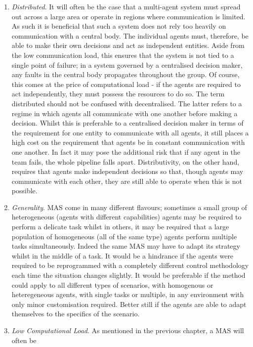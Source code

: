 \documentclass[.../main.tex]{subfiles}
\begin{document}
\begin{enumerate}
    \item {\em Distributed}. It will often be the case that a multi-agent system must spread out
across a large area or operate in regions where communication is limited. As such it is beneficial
that such a system does not rely too heavily on communication with a central body. The individual
agents must, therefore, be able to make their own decisions and act as independent entities. Aside
from the low communication load, this ensures that the system is not tied to a single point of
failure; in a system governed by a centralised decision maker, any faults in the central body
propagates throughout the group. Of course, this comes at the price of computational load - if the
agents are required to act independently, they must possess the resources to do so. The term
distributed should not be confused with decentralised. The latter refers to a regime in which agents
all communicate with one another before making a decision. Whilst this is preferable to a
centralised decision maker in terms of the requirement for one entity to communicate with all
agents, it still places a high cost on the requirement that agents be in constant communication with
one another. In fact it may pose the additional risk that if any agent in the team fails, the whole
pipeline falls apart. Distributivity, on the other hand, requires that agents make independent
decisions so that, though agents may communicate with each other, they are still able to operate
when this is not possible.
    \item {\em Generality}. MAS come in many different flavours; sometimes a small group of
heterogeneous  (agents with different capabilities) agents may be required to perform a delicate
task whilst in others, it may be required that a large population of homogeneous (all of the same
type) agents perform multiple tasks simultaneously. Indeed the same MAS may have to adapt its
strategy whilst in the middle of a task. It would be a hindrance if the agents were required to be
reprogrammed with a completely different control methodology each time the situation changes
slightly. It would be preferable if the method could apply to all different types of scenarios, with
homogenous or heteregeneous agents, with single tasks or multiple, in any environment with only
minor customisation required. Better still if the agents are able to adapt themselves to the
specifics of the scenario.
    \item {\em Low Computational Load}. As mentioned in the previous chapter, a MAS will often be

\end{enumerate}
\end{document}
